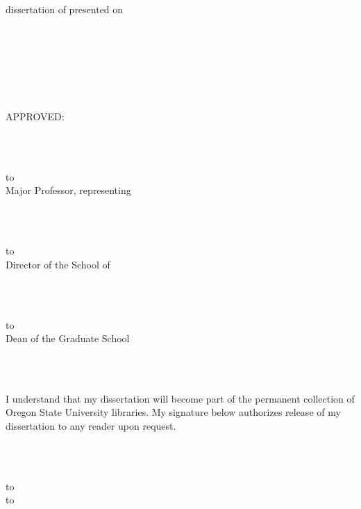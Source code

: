 \thispagestyle{empty}
{\baselineskip=14.5pt
\def\ruleline{\hbox to \hsize{\hrulefill}\\[-2ex]}
\noindent \underline{\mydegree} dissertation of
\underline{\myname} presented on \\ \underline{\myday}
\strut\\
\strut\\
\strut\\
\strut\\
APPROVED:\\
\strut\\
\strut\\
\ruleline
Major Professor, representing \mymajor\\
\strut\\
\strut\\
\ruleline
Director of the School of \mydepart\\
\strut\\
\strut\\
\ruleline
Dean of the Graduate School\\
\strut\\
\strut\\
I understand that my dissertation will become part of the permanent collection of
Oregon State University libraries.  My signature below authorizes release of
my dissertation to any reader upon request.
\strut\\
\strut\\
\ruleline
\hbox to \textwidth{\hfil \myname, Author \hfil}
}
\enlargethispage{80pt}
